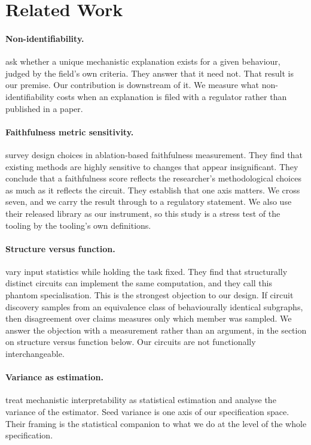 \documentclass[letterpaper]{article} %
\begin{document}
\section{Related Work}

\paragraph{Non-identifiability.}
\citet{meloux2025} ask whether a unique mechanistic explanation exists for a
given behaviour, judged by the field's own criteria. They answer that it need
not. That result is our premise. Our contribution is downstream of it. We
measure what non-identifiability costs when an explanation is filed with a
regulator rather than published in a paper.

\paragraph{Faithfulness metric sensitivity.}
\citet{miller2024} survey design choices in ablation-based faithfulness
measurement. They find that existing methods are highly sensitive to changes
that appear insignificant. They conclude that a faithfulness score reflects the
researcher's methodological choices as much as it reflects the circuit. They
establish that one axis matters. We cross seven, and we carry the result through
to a regulatory statement. We also use their released library as our instrument,
so this study is a stress test of the tooling by the tooling's own definitions.

\paragraph{Structure versus function.}
\citet{bayatmakou2026} vary input statistics while holding the task fixed. They
find that structurally distinct circuits can implement the same computation, and
they call this phantom specialisation. This is the strongest objection to our
design. If circuit discovery samples from an equivalence class of behaviourally
identical subgraphs, then disagreement over claims measures only which member was
sampled. We answer the objection with a measurement rather than an argument, in
the section on structure versus function below. Our circuits are not
functionally interchangeable.

\paragraph{Variance as estimation.}
\citet{meloux2025b} treat mechanistic interpretability as statistical estimation
and analyse the variance of the estimator. Seed variance is one axis of our
specification space. Their framing is the statistical companion to what we do at
the level of the whole specification.
\end{document}
